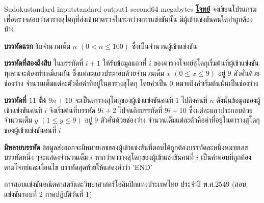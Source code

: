 \documentclass[11pt,a4paper]{article}
\begin{document}
\begin{problem}{Sudoku}{standard input}{standard output}{1 second}{64 megabytes}
\bigskip
\underline{\textbf{โจทย์}}  จงเขียนโปรแกรมเพื่อตรวจสอบว่าตารางสุโดกุที่ส่งเข้ามาตรวจในระหว่างการแข่งขันนั้น มีผู้เข้าแข่งขันคนใดทำถูกต้องบ้าง

\InputFile

\textbf{บรรทัดแรก} รับจำนวนเต็ม $n$ $(0 < n \leq 100)$ ซึ่งเป็นจำนวนผู้เข้าแข่งขัน

\textbf{บรรทัดที่สองถึงสิบ} ในบรรทัดที่ $i+1$ ให้รับข้อมูลแถวที่ $i$ ของตารางโจทย์สุโดกุเริ่มต้นที่ผู้เข้าแข่งขันทุกคนจะต้องทำเหมือนกัน ซึ่งแต่ละแถวประกอบด้วยจำนวนเต็ม $x$ $(0 \leq x \leq 9)$ อยู่ $9$ ตัวคั่นด้วยช่องว่าง จำนวนเต็มแต่ละตัวคือค่าที่อยู่ในตารางสุโดกุ โดยค่าเป็น $0$ หมายถึงค่าเริ่มต้นนั้นเป็นช่องว่าง

\textbf{บรรทัดที่ $11$ ถึง $9n+10$} จะเป็นตารางสุโดกุของผู้เข้าแข่งขันคนที่ $1$ ไปถึงคนที่ $n$ ดังนั้นข้อมูลของผู้เข้าแข่งขันคนที่ $i$ จึงเริ่มต้นที่บรรทัด $9i+2$ ไปจนถึงบรรทัดที่ $9i+10$ ซึ่งแต่ละแถวประกอบด้วยจำนวนเต็ม $y$ $(1 \leq y \leq 9)$ อยู่ $9$ ตัวคั่นด้วยช่องว่าง จำนวนเต็มแต่ละตัวคือค่าที่อยู่ในตารางสุโดกุของผู้เข้าแข่งขันคนที่ $i$

\OutputFile

\textbf{มีหลายบรรทัด} ข้อมูลส่งออกจะมีหมายเลขของผู้เข้าแข่งขันที่ตอบได้ถูกต้องบรรทัดละหนึ่งหมายเลข บรรทัดหนึ่ง ๆจะแสดงจำนวนเต็ม $i$ หากว่าตารางสุโดกุของผู้เข้าแข่งขันคนที่ $i$ เป็นคำตอบที่ถูกต้องตามโจทย์และเงื่อนไข บรรทัดสุดท้ายให้แสดงคำว่า 'END'

\Examples

\begin{example}
%
\end{example}


\Source

การสอบแข่งขันคณิตศาสตร์และวิทยาศาสตร์โอลิมปิกแห่งประเทศไทย
ประจำปี พ.ศ.2549 (สอบแข่งขันรอบที่ 2 ภาคปฏิบัติวันที่ 1)

\end{problem}
\end{document}

